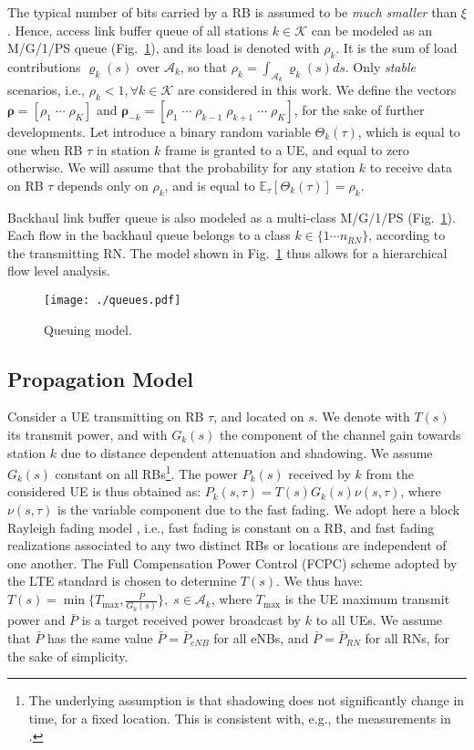 \documentclass[draftcls,onecolumn]{IEEEtran}
\theoremstyle{plain}
\theoremstyle{definition}
\begin{document}
The typical number of bits carried by a RB is assumed to be {\it much smaller} than $\xi$. Hence, access link buffer queue of all stations $k\in \mathcal{K}$ can be modeled as an M/G/1/PS queue (Fig.~\ref{fig:queues}), and its load is denoted with $\rho_k$. It is the sum of load contributions $\varrho_k(s)$ over $\mathcal{A}_k$, so that 
$\rho_k= \int_{\mathcal{A}_k} \varrho_k(s){ds}$. Only {\it stable} scenarios, i.e., $\rho_k<1, \forall k \in \mathcal{K}$ are considered in this work. We define the vectors $\boldsymbol{\rho}=[\rho_1\; \cdots \; \rho_{K}]$ and $\boldsymbol{\rho}_{-k}=[\rho_1 \;\cdots \; \rho_{k-1}\; \rho_{k+1} \;\cdots \;\rho_{K}]$, for the sake of further developments. 
Let introduce a binary random variable $\Theta_k(\tau)$, which is equal to one when RB $\tau$ in station $k$ frame is granted to a UE, and equal to zero otherwise. 
We will assume that the probability for any station $k$ to receive data on RB $\tau$ depends only on $\rho_k$, and is equal to $\mathbb{E}_{\tau}[\Theta_k(\tau)]=\rho_k$.

Backhaul link buffer queue is also modeled as a multi-class M/G/1/PS (Fig.~\ref{fig:queues}). Each flow in the backhaul queue belongs to a class $k \in \{ 1\cdots n_{RN}\}$, according to the transmitting RN. The model shown in Fig.~\ref{fig:queues} thus allows for a hierarchical flow level analysis. 
\begin{figure}
 \centering
\texttt{[image: ./queues.pdf]} 
 \caption{Queuing model.}
\label{fig:queues} 
\end{figure} 

\subsection{Propagation Model}
Consider a UE transmitting on RB $\tau$, and located on $s$. We denote with $T(s)$ its transmit power, and with $G_k(s)$ the component of the channel gain towards station $k$ due to distance dependent attenuation and shadowing. We assume $G_k(s)$ constant on all RBs\footnote{The underlying assumption is that shadowing does not significantly change in time, for a fixed location. This is consistent with, e.g., the measurements in \cite{Kurose}.}. The power $P_k(s)$ received by $k$ from the considered UE is thus obtained as: $P_k(s,\tau)=T(s)G_k(s)\nu(s,\tau)$, 
where $\nu(s,\tau)$ is the variable component due to the fast fading. We adopt here a block Rayleigh fading model \cite{block_fading}, i.e., fast fading is constant on a RB, and fast fading realizations associated to any two distinct RBs or locations are independent of one another. The Full Compensation Power Control (FCPC) scheme adopted by the LTE standard \cite{36.814} is chosen to determine $T(s)$. We thus have:
$T(s)=\min\{ T_{\max} , \frac{\bar{P}}{G_k(s)} \}, \;s \in \mathcal{A}_k$,
where $T_{\max}$ is the UE maximum transmit power and $\bar{P}$ is a target received power broadcast by $k$ to all UEs.
We assume that $\bar{P}$ has the same value $\bar{P}{=}\bar{P}_{eNB}$ for all eNBs, and $\bar{P}{=}\bar{P}_{RN}$ for all RNs, for the sake of simplicity.    
\end{document}
